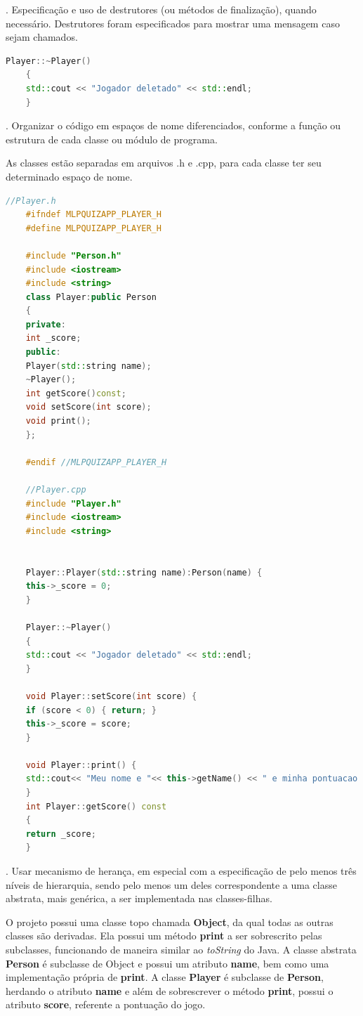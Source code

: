 \documentclass[rel_mlp]{iiufrgs}
\begin{document}
\begin{itemize}
	. Especificação e uso de destrutores (ou métodos de finalização), quando necessário.
	Destrutores foram especificados para mostrar uma mensagem caso sejam chamados.
	\begin{lstlisting}[language=C++, caption={Exemplo de destrutor}]
	Player::~Player()
	{
	std::cout << "Jogador deletado" << std::endl;
	}
	\end{lstlisting}
	
	. Organizar o código em espaços de nome diferenciados, conforme a função ou estrutura de cada classe ou módulo de programa.
	
	As classes estão separadas em arquivos .h e .cpp, para cada classe ter seu determinado espaço de nome.
	
	\begin{lstlisting}[language=C++, caption={Separação entre definição e implementação}]
	//Player.h
	#ifndef MLPQUIZAPP_PLAYER_H
	#define MLPQUIZAPP_PLAYER_H
	
	#include "Person.h"
	#include <iostream>
	#include <string>
	class Player:public Person
	{
	private:
	int _score;
	public:
	Player(std::string name);
	~Player();
	int getScore()const;
	void setScore(int score);
	void print();
	};
	
	#endif //MLPQUIZAPP_PLAYER_H
	
	//Player.cpp
	#include "Player.h"
	#include <iostream>
	#include <string>
	
	
	Player::Player(std::string name):Person(name) {
	this->_score = 0;
	}
	
	Player::~Player()
	{
	std::cout << "Jogador deletado" << std::endl;
	}
	
	void Player::setScore(int score) {
	if (score < 0) { return; }
	this->_score = score;
	}
	
	void Player::print() {
	std::cout<< "Meu nome e "<< this->getName() << " e minha pontuacao e " << this->getScore() << std::endl;
	}
	int Player::getScore() const
	{
	return _score;
	}
	\end{lstlisting}
	
	. Usar mecanismo de herança, em especial com a especificação de pelo menos três níveis de hierarquia, sendo pelo menos um deles correspondente a uma classe abstrata, mais genérica, a ser implementada nas classes-filhas.
	
	O projeto possui uma classe topo chamada \textbf{Object}, da qual todas as outras classes são derivadas. Ela possui um método \textbf{print} a ser sobrescrito pelas subclasses, funcionando de maneira similar ao \textit{toString} do Java. A classe abstrata \textbf{Person} é subclasse de Object e possui um atributo \textbf{name}, bem como uma implementação própria de \textbf{print}. A classe \textbf{Player} é subclasse de \textbf{Person}, herdando o atributo \textbf{name} e além de sobrescrever o método \textbf{print}, possui o atributo \textbf{score}, referente a pontuação do jogo. 
	

\end{itemize}
\end{document}

